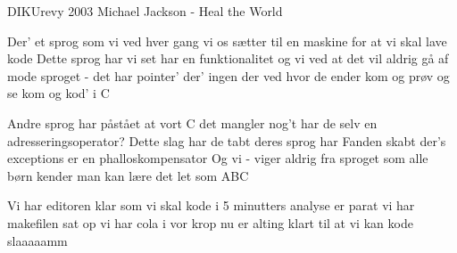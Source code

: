 {DIKUrevy 2003}
{Michael Jackson - Heal the World}
{
Der' et sprog
som vi ved
hver gang vi os sætter til
en maskine for at vi skal lave kode 
Dette sprog
har vi set
har en funktionalitet
og vi ved at det vil aldrig gå af mode 
sproget - det har pointer'
der' ingen der ved hvor de ender
kom og prøv og se
kom og kod' i C


Andre sprog
har påstået
at vort C det mangler nog't
har de selv en adresseringsoperator?
Dette slag
har de tabt
deres sprog har Fanden skabt
der's exceptions er en phalloskompensator
Og vi - viger aldrig
fra sproget som alle børn kender
man kan lære det
let som ABC




Vi har editoren klar som vi skal kode i
5 minutters analyse er parat
vi har makefilen sat op
vi har cola i vor krop
nu er alting klart til at vi kan kode slaaaaamm

}

